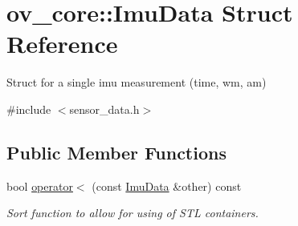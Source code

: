 \hypertarget{structov__core_1_1ImuData}{}\section{ov\+\_\+core\+:\+:Imu\+Data Struct Reference}
\label{structov__core_1_1ImuData}


Struct for a single imu measurement (time, wm, am)  




{\ttfamily \#include $<$sensor\+\_\+data.\+h$>$}

\subsection*{Public Member Functions}
\begin{DoxyCompactItemize}
\item 
\mbox{\label{structov__core_1_1ImuData_ac7c9b5b27b5a1fc4461571d3d4733b83}} 
bool \hyperlink{structov__core_1_1ImuData_ac7c9b5b27b5a1fc4461571d3d4733b83}{operator$<$} (const \hyperlink{structov__core_1_1ImuData}{Imu\+Data} \&other) const
\begin{DoxyCompactList}\small\item\em Sort function to allow for using of S\+TL containers. \end{DoxyCompactList}\end{DoxyCompactItemize}
